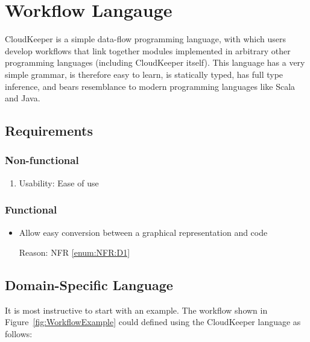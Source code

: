 
\chapter{Workflow Langauge} \label{ch:DSL}

CloudKeeper is a simple data-flow programming language, with which users develop workflows that link together modules implemented in arbitrary other programming languages (including CloudKeeper itself). This language has a very simple grammar, is therefore easy to learn, is statically typed, has full type inference, and bears resemblance to modern programming languages like Scala and Java.

\section{Requirements}

\subsection{Non-functional}

\begin{enumerate}
	\item \label{enum:NFR:D1} Usability: Ease of use
\end{enumerate}

\subsection{Functional}

\begin{itemize}
	\item Allow easy conversion between a graphical representation and code
		
		Reason: NFR \ref{enum:NFR:D1}
\end{itemize}

\section{Domain-Specific Language}

It is most instructive to start with an example. The workflow shown in Figure~\ref{fig:WorkflowExample} could defined using the CloudKeeper language as follows:

